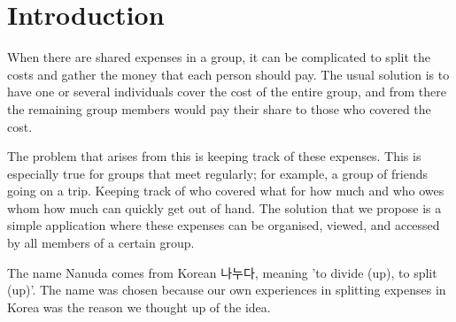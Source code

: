 \documentclass[conference]{IEEEtran}
\begin{document}
\section{Introduction}
When there are shared expenses in a group, it can be complicated to split the costs and gather the money that each person should pay. The usual solution is to have one or several individuals cover the cost of the entire group, and from there the remaining group members would pay their share to those who covered the cost.

The problem that arises from this is keeping track of these expenses. This is especially true for groups that meet regularly; for example, a group of friends going on a trip. Keeping track of who covered what for how much and who owes whom how much can quickly get out of hand. The solution that we propose is a simple application where these expenses can be organised, viewed, and accessed by all members of a certain group.

The name Nanuda comes from Korean 나누다, meaning 'to divide (up), to split (up)'. The name was chosen because our own experiences in splitting expenses in Korea was the reason we thought up of the idea.
\end{document}

